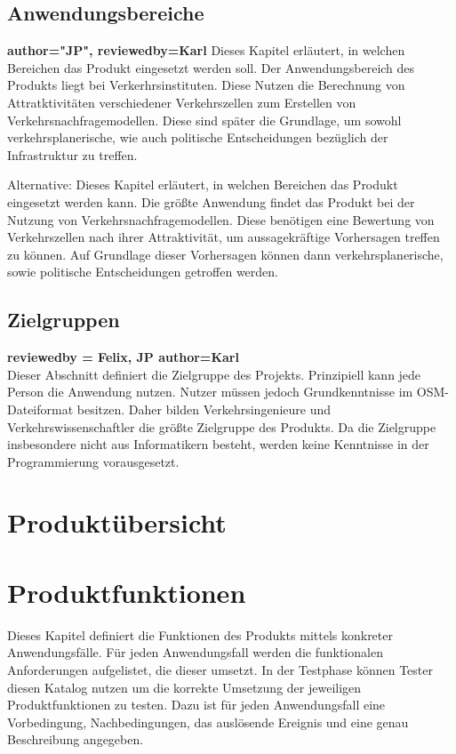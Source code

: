 \documentclass[parskip=full]{scrartcl} %
\begin{document}
\subsection{Anwendungsbereiche}
\textbf{author="JP", reviewedby=Karl} 
Dieses Kapitel erläutert, in welchen Bereichen das Produkt eingesetzt werden soll. Der Anwendungsbereich des Produkts liegt bei Verkerhrsinstituten. Diese Nutzen die Berechnung von Attratktivitäten verschiedener Verkehrszellen zum Erstellen von Verkehrsnachfragemodellen. Diese sind später die Grundlage, um sowohl verkehrsplanerische, wie auch politische Entscheidungen bezüglich der Infrastruktur zu treffen.

Alternative:
Dieses Kapitel erläutert, in welchen Bereichen das Produkt eingesetzt werden kann. Die größte Anwendung findet das Produkt bei der Nutzung von Verkehrsnachfragemodellen. Diese benötigen eine Bewertung von Verkehrszellen nach ihrer Attraktivität, um aussagekräftige Vorhersagen treffen zu können. Auf Grundlage dieser Vorhersagen können dann verkehrsplanerische, sowie politische Entscheidungen getroffen werden.


\subsection{Zielgruppen}
\textbf{reviewedby = Felix, JP author=Karl\\}
Dieser Abschnitt definiert die Zielgruppe des Projekts. Prinzipiell kann jede Person die Anwendung nutzen. Nutzer müssen jedoch Grundkenntnisse im OSM-Dateiformat besitzen. Daher bilden Verkehrsingenieure und Verkehrswissenschaftler die größte Zielgruppe des Produkts. Da die Zielgruppe insbesondere nicht aus Informatikern besteht, werden keine Kenntnisse in der Programmierung vorausgesetzt.
\newpage







\section{Produktübersicht}
\newpage










\section{Produktfunktionen}
Dieses Kapitel definiert die Funktionen des Produkts mittels konkreter Anwendungsfälle. Für jeden Anwendungsfall werden die funktionalen Anforderungen aufgelistet, die dieser umsetzt. In der Testphase können Tester diesen Katalog nutzen um die korrekte Umsetzung der jeweiligen Produktfunktionen zu testen. Dazu ist für jeden Anwendungsfall eine Vorbedingung, Nachbedingungen, das auslösende Ereignis und eine genau Beschreibung angegeben.
\newpage
\end{document}
